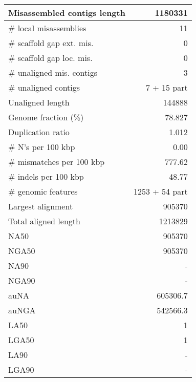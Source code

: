 \documentclass[12pt,a4paper]{article}
\begin{document}
\begin{table}[ht]
\begin{center}
\begin{tabular}{|l*{1}{|r}|}
Misassembled contigs length & 1180331 \\ \hline
\# local misassemblies & 11 \\ \hline
\# scaffold gap ext. mis. & 0 \\ \hline
\# scaffold gap loc. mis. & 0 \\ \hline
\# unaligned mis. contigs & 3 \\ \hline
\# unaligned contigs & 7 + 15 part \\ \hline
Unaligned length & 144888 \\ \hline
Genome fraction (\%) & 78.827 \\ \hline
Duplication ratio & 1.012 \\ \hline
\# N's per 100 kbp & 0.00 \\ \hline
\# mismatches per 100 kbp & 777.62 \\ \hline
\# indels per 100 kbp & 48.77 \\ \hline
\# genomic features & 1253 + 54 part \\ \hline
Largest alignment & 905370 \\ \hline
Total aligned length & 1213829 \\ \hline
NA50 & 905370 \\ \hline
NGA50 & 905370 \\ \hline
NA90 & - \\ \hline
NGA90 & - \\ \hline
auNA & 605306.7 \\ \hline
auNGA & 542566.3 \\ \hline
LA50 & 1 \\ \hline
LGA50 & 1 \\ \hline
LA90 & - \\ \hline
LGA90 & - \\ \hline
\end{tabular}
\end{center}
\end{table}
\end{document}
